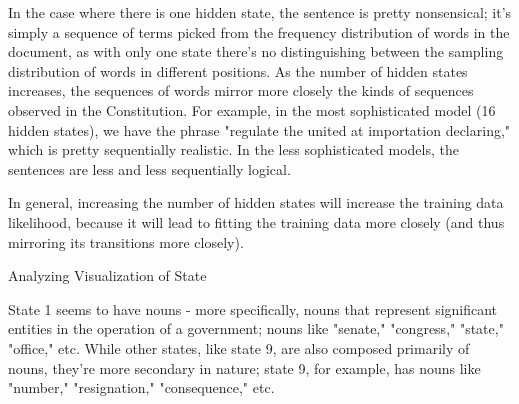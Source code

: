 \begin{subsolution}
In the case where there is one hidden state, the sentence is pretty nonsensical; it's simply a sequence of terms picked from the
frequency distribution of words in the document, as with only one state there's no distinguishing between the sampling distribution of
words in different positions.
As the number of hidden states increases, the sequences of words mirror more closely the kinds of sequences observed in the Constitution.
For example, in the most sophisticated model (16 hidden states), we have the phrase "regulate the united at importation declaring," which is pretty sequentially realistic.
In the less sophisticated models, the sentences are less and less sequentially logical.

In general, increasing the number of hidden states will increase the training data likelihood, because it will lead to fitting the training data more closely (and thus
mirroring its transitions more closely).
\end{subsolution}
\clearpage


\indent\problem[5] %
Analyzing Visualization of State
\begin{subsolution}
State 1 seems to have nouns - more specifically, nouns that represent significant entities in
the operation of a government; nouns like "senate," "congress," "state," "office," etc. While other states, like state 9, are also
composed primarily of nouns, they're more secondary in nature; state 9, for example, has nouns like "number," "resignation," "consequence," etc.
\end{subsolution}
\clearpage



